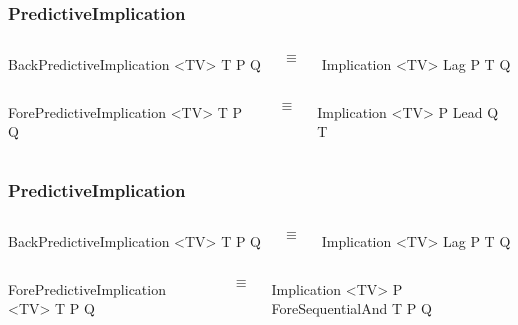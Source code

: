 \documentclass[aspectratio=169]{beamer}
\begin{document}
\begin{frame}[fragile]
  \frametitle{PredictiveImplication}

  \begin{columns}
    \column{1in}
\begin{semiverbatim}
BackPredictiveImplication <TV>
  T
  P
  Q
\end{semiverbatim}

    \column{0.5in}
    $$\equiv$$

    \column{1in}
\begin{semiverbatim}
Implication <TV>
  Lag
    P
    T
  Q
\end{semiverbatim}

  \end{columns}

    \begin{columns}
    \column{1in}
\begin{semiverbatim}
ForePredictiveImplication <TV>
  T
  P
  Q
\end{semiverbatim}

    \column{0.5in}
    $$\equiv$$

    \column{1in}
\begin{semiverbatim}
Implication <TV>
  P
  Lead
    Q
    T
\end{semiverbatim}

  \end{columns}

\end{frame}

\begin{frame}[fragile]
  \frametitle{PredictiveImplication}

  \begin{columns}
    \column{1in}
\begin{semiverbatim}
BackPredictiveImplication <TV>
  T
  P
  Q
\end{semiverbatim}

    \column{0.5in}
    $$\equiv$$

    \column{1in}
\begin{semiverbatim}
Implication <TV>
  Lag
    P
    T
  Q
\end{semiverbatim}

  \end{columns}

    \begin{columns}
    \column{1in}
\begin{semiverbatim}
ForePredictiveImplication <TV>
  T
  P
  Q
\end{semiverbatim}

    \column{0.5in}
    $$\equiv$$

    \column{1in}
\begin{semiverbatim}
Implication <TV>
  P
  ForeSequentialAnd
    T
    P
    Q
\end{semiverbatim}

  \end{columns}

\end{frame}
\end{document}
